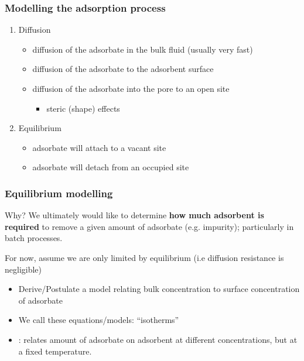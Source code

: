 \begin{frame}\frametitle{Modelling the adsorption process}
	\begin{enumerate}
		\item	Diffusion
			\begin{itemize}
				\item	diffusion of the adsorbate in the bulk fluid (usually very fast)
				\item	diffusion of the adsorbate to the adsorbent surface
				\item	diffusion of the adsorbate into the pore to an open site
				\begin{itemize}
					\item	steric (shape) effects
				\end{itemize}
			\end{itemize}
		\item	Equilibrium
			\begin{itemize}
				\item	adsorbate will attach to a vacant site
				\item	adsorbate will detach from an occupied site
			\end{itemize}
	\end{enumerate}
\end{frame}

\begin{frame}\frametitle{Equilibrium modelling}
	\begin{exampleblock}{Why?}
		We ultimately would like to determine \textbf{how much adsorbent is required} to remove a given amount of adsorbate (e.g. impurity); particularly in batch processes.
	\end{exampleblock}

	\vspace{12pt}
	For now, assume we are only limited by equilibrium (i.e diffusion resistance is negligible)	
	\begin{itemize}
		\item	Derive/Postulate a model relating bulk concentration to surface concentration of adsorbate
		\item	We call these equations/models: ``isotherms''
		\item	{\color{purple}{Isotherm}}: relates amount of adsorbate on adsorbent at different concentrations, but at a fixed temperature.
	\end{itemize}
\end{frame}

